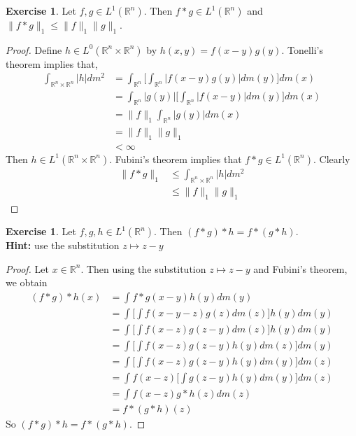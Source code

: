 \documentclass{book}
\theoremstyle{definition}
\newtheorem{ex}[definition]{Exercise}
\newcommand{\R}{\mathbb{R}}
\newcommand{\lex}[1]{\label{ex:#1}}
\DeclareMathOperator*{\0}{\mbf{0}}
\DeclareMathOperator*{\1}{\mbf{1}}
\begin{document}
	\begin{ex}
	\lex{201}Let $f, g \in L^1(\R^n)$. Then $f * g \in L^1(\R^n)$ and $\|f * g\|_1 \leq \|f\|_1 \|g\|_1$. 
	\end{ex}	
	
	\begin{proof}
	Define $h \in L^0(\R^n \times \R^n)$ by $h(x,y) = f(x-y)g(y)$. Tonelli's theorem implies that, 
	\begin{align*}
	\int_{\R^n \times \R^n} |h| dm^2
	&= \int_{\R^n} \bigg[  \int_{\R^n} |f(x-y)g(y)| dm(y) \bigg] dm(x) \\
	&= \int_{\R^n} |g(y)| \bigg[  \int_{\R^n} |f(x-y)| dm(y) \bigg] dm(x) \\
	&=  \|f\|_1 \int_{\R^n} |g(y)| dm(x) \\
	&= \|f\|_1 \|g\|_1\\
	& < \infty
	\end{align*}
	Then $h \in L^1(\R^n \times \R^n)$. Fubini's theorem implies that $f * g \in L^1(\R^n)$. Clearly 
	\begin{align*}
	\|f *g\|_1 
	& \leq \int_{\R^n \times \R^n} |h| dm^2 \\
	& \leq \|f\|_1 \|g\|_1
	\end{align*}
	\end{proof}
	
	
	
	\begin{ex}
	\lex{202} Let $f, g, h \in L^1(\R^n)$. Then $(f * g) * h = f * (g * h)$. \\
	\textbf{Hint:} use the substitution $z \mapsto z-y$
	\end{ex}
	
	\begin{proof}
	Let $x \in \R^n$. Then using the substitution $z \mapsto z-y$ and Fubini's theorem, we obtain
	\begin{align*}
	(f*g)*h(x) 
	&= \int f * g(x - y) h (y) dm(y) \\
	&= \int \bigg[ \int f(x-y-z) g(z) dm(z)  \bigg] h(y) dm(y) \\
	&= \int \bigg[ \int f(x-z) g(z - y) dm(z)  \bigg] h(y) dm(y) \\
	&= \int \bigg[ \int f(x-z) g(z - y)  h(y)dm(z)  \bigg]  dm(y) \\
	&= \int \bigg[ \int f(x-z) g(z - y)  h(y) dm(y)  \bigg] dm(z) \\
	&= \int f(x-z) \bigg[ \int g(z - y)  h(y) dm(y)  \bigg] dm(z) \\
	&= \int f(x-z) g*h(z) dm(z) \\
	&= f*(g*h)(z)
	\end{align*}
	So $(f*g)*h = f*(g*h)$. 
	\end{proof}
	
\end{document}
